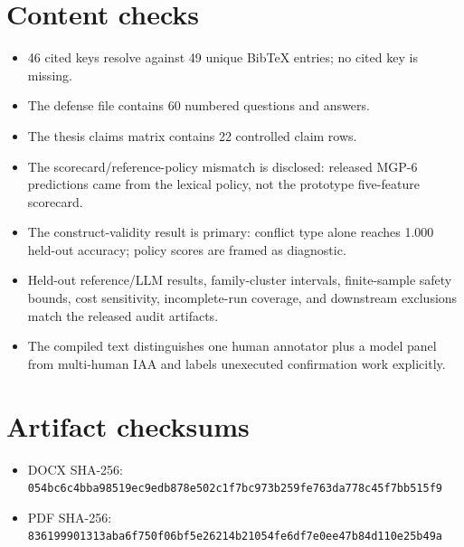 \section{Content checks}\label{content-checks}

\begin{itemize}
\tightlist
\item
  46 cited keys resolve against 49 unique BibTeX entries; no cited key
  is missing.
\item
  The defense file contains 60 numbered questions and answers.
\item
  The thesis claims matrix contains 22 controlled claim rows.
\item
  The scorecard/reference-policy mismatch is disclosed: released MGP-6
  predictions came from the lexical policy, not the prototype
  five-feature scorecard.
\item
  The construct-validity result is primary: conflict type alone reaches
  1.000 held-out accuracy; policy scores are framed as diagnostic.
\item
  Held-out reference/LLM results, family-cluster intervals,
  finite-sample safety bounds, cost sensitivity, incomplete-run
  coverage, and downstream exclusions match the released audit
  artifacts.
\item
  The compiled text distinguishes one human annotator plus a model panel
  from multi-human IAA and labels unexecuted confirmation work
  explicitly.
\end{itemize}

\section{Artifact checksums}\label{artifact-checksums}

\begin{itemize}
\tightlist
\item
  DOCX SHA-256:
  \texttt{054bc6c4bba98519ec9edb878e502c1f7bc973b259fe763da778c45f7bb515f9}
\item
  PDF SHA-256:
  \texttt{836199901313aba6f750f06bf5e26214b21054fe6df7e0ee47b84d110e25b49a}
\end{itemize}
